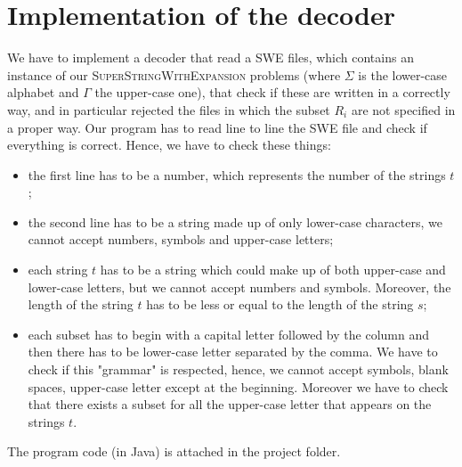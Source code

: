 \documentclass[paper=a4, fontsize=11pt]{scrartcl}
\numberwithin{equation}{section}		%
\numberwithin{figure}{section}			%
\numberwithin{table}{section}				%
\begin{document}
\section{Implementation of the decoder}
We have to implement a decoder that read a SWE files, which contains an instance of our \textsc{SuperStringWithExpansion} problems (where $\Sigma$ is the lower-case alphabet and $\Gamma$ the upper-case one), that check if these are written in a correctly way, and in particular rejected the files in which the subset $R_i$ are not specified in a proper way.  \newline
Our program has to read line to line the SWE file and check if everything is correct. Hence, we have to check these things:
\begin{itemize}
	\item the first line has to be a number, which represents the number of the strings $t$;
	\item the second line has to be a string made up of only lower-case characters, we cannot accept numbers, symbols and upper-case letters;
	\item each string $t$ has to be a string which could make up of both upper-case and lower-case letters, but we cannot accept numbers and symbols. Moreover, the length of the string $t$ has to be less or equal to the length of the string $s$;
	\item each subset has to begin with a capital letter followed by the column and then there has to be lower-case letter separated by the comma. We have to check if this "grammar" is respected, hence, we cannot accept symbols, blank spaces, upper-case letter except at the beginning. Moreover we have to check that there exists a subset for all the upper-case letter that appears on the strings $t$.
\end{itemize}
The program code (in Java) is attached in the project folder. 






\end{document}
